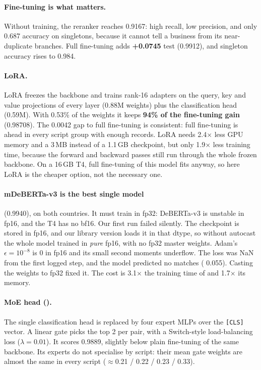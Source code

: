 \paragraph{Fine-tuning is what matters.} Without training, the reranker reaches 0.9167: high recall, low
precision, and only 0.687 accuracy on singletons, because it cannot tell a business from its near-duplicate
branches. Full fine-tuning adds \textbf{+0.0745} test \fhalf{} (0.9912), and singleton accuracy rises to 0.984.

\paragraph{LoRA.} LoRA freezes the backbone and trains rank-16 adapters on the query, key
and value projections of every layer (0.88M weights) plus the classification head (0.59M). With 0.53\% of the
weights it keeps \textbf{94\% of the fine-tuning gain} (0.98708). The 0.0042 gap to full fine-tuning is
consistent: full fine-tuning is ahead in every script group with enough records. LoRA needs 2.4$\times$ less
GPU memory and a 3\,MB instead of a 1.1\,GB checkpoint, but only 1.9$\times$ less training time, because the
forward and backward passes still run through the whole frozen backbone. On a 16\,GB T4, full fine-tuning
of this model fits anyway, so here LoRA is the cheaper option, not the necessary one.

\paragraph{mDeBERTa-v3 is the best single model} (0.9940), on both countries. It must train in fp32:
DeBERTa-v3 is unstable in fp16, and the T4 has no bf16. Our first run failed silently. The checkpoint is
stored in fp16, and our library version loads it in that dtype, so without autocast the whole model trained
in \emph{pure} fp16, with no fp32 master weights. Adam's $\epsilon=10^{-8}$ is 0 in fp16 and its small
second moments underflow. The loss was NaN from the first logged step, and the model predicted no matches
(\fhalf{} 0.055). Casting the weights to fp32 fixed it. The cost is 3.1$\times$ the training time of
 and 1.7$\times$ its memory.

\paragraph{MoE head ().} The single classification head is replaced by four expert MLPs over the
\texttt{[CLS]} vector. A linear gate picks the top 2 per pair, with a Switch-style load-balancing
loss ($\lambda=0.01$). It scores 0.9889, slightly below plain
fine-tuning of the same backbone. Its experts do not specialise by script: their mean gate weights are almost
the same in every script ($\approx$0.21 / 0.22 / 0.23 / 0.33).

